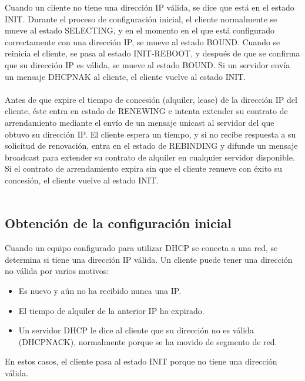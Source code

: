 Cuando un cliente no tiene una dirección IP válida, se dice que está en el estado INIT. Durante el proceso de configuración inicial, el cliente normalmente se mueve al estado SELECTING, y en el momento en el que está configurado correctamente con una dirección IP, se mueve al estado BOUND. Cuando se reinicia el cliente, se pasa al estado INIT-REBOOT, y después de que se confirma que su dirección IP es válida, se mueve al estado BOUND. Si un servidor envía un mensaje DHCPNAK al cliente, el cliente vuelve al estado INIT.\\\\
Antes de que expire el tiempo de concesión (alquiler, lease) de la dirección IP del cliente, éste entra en estado de RENEWING e intenta extender su contrato de arrendamiento mediante el envío de un mensaje unicast al servidor del que obtuvo su dirección IP. El cliente espera un tiempo, y si no recibe respuesta a su solicitud de renovación, entra en el estado de REBINDING y difunde un mensaje broadcast para extender su contrato de alquiler en cualquier servidor disponible. Si el contrato de arrendamiento expira sin que el cliente renueve con éxito su concesión, el cliente vuelve al estado INIT.\\\\

\subsection{Obtención de la configuración inicial}
	Cuando un equipo configurado para utilizar DHCP se conecta a una red, se determina si tiene una dirección IP válida. Un cliente puede tener una dirección no válida por varios motivos:
	
	\begin{itemize}
		\item Es nuevo y aún no ha recibido nunca una IP.
		\item El tiempo de alquiler de la anterior IP ha expirado.
		\item Un servidor DHCP le dice al cliente que su dirección no es válida (DHCPNACK), normalmente porque se ha movido de segmento de red.
	\end{itemize}

En estos casos, el cliente pasa al estado INIT porque no tiene una dirección válida.\\\\


